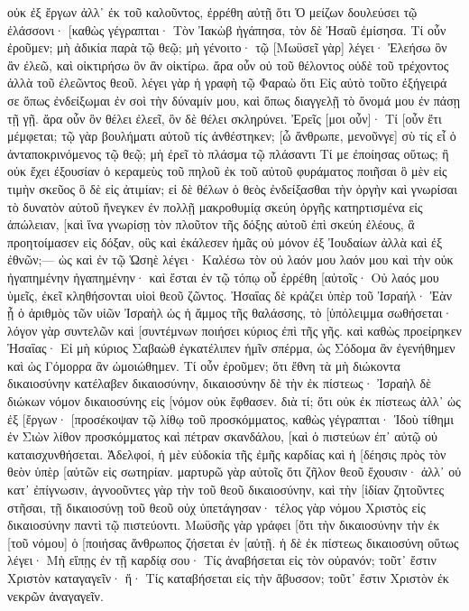 οὐκ ἐξ ἔργων ἀλλ᾽ ἐκ τοῦ καλοῦντος, ἐρρέθη αὐτῇ ὅτι Ὁ μείζων δουλεύσει τῷ ἐλάσσονι· 
[καθὼς γέγραπται· Τὸν Ἰακὼβ ἠγάπησα, τὸν δὲ Ἠσαῦ ἐμίσησα. 
Τί οὖν ἐροῦμεν; μὴ ἀδικία παρὰ τῷ θεῷ; μὴ γένοιτο· 
τῷ [Μωϋσεῖ γὰρ] λέγει· Ἐλεήσω ὃν ἂν ἐλεῶ, καὶ οἰκτιρήσω ὃν ἂν οἰκτίρω. 
ἄρα οὖν οὐ τοῦ θέλοντος οὐδὲ τοῦ τρέχοντος ἀλλὰ τοῦ ἐλεῶντος θεοῦ. 
λέγει γὰρ ἡ γραφὴ τῷ Φαραὼ ὅτι Εἰς αὐτὸ τοῦτο ἐξήγειρά σε ὅπως ἐνδείξωμαι ἐν σοὶ τὴν δύναμίν μου, καὶ ὅπως διαγγελῇ τὸ ὄνομά μου ἐν πάσῃ τῇ γῇ. 
ἄρα οὖν ὃν θέλει ἐλεεῖ, ὃν δὲ θέλει σκληρύνει. 
Ἐρεῖς [μοι οὖν]· Τί [οὖν ἔτι μέμφεται; τῷ γὰρ βουλήματι αὐτοῦ τίς ἀνθέστηκεν; 
[ὦ ἄνθρωπε, μενοῦνγε] σὺ τίς εἶ ὁ ἀνταποκρινόμενος τῷ θεῷ; μὴ ἐρεῖ τὸ πλάσμα τῷ πλάσαντι Τί με ἐποίησας οὕτως; 
ἢ οὐκ ἔχει ἐξουσίαν ὁ κεραμεὺς τοῦ πηλοῦ ἐκ τοῦ αὐτοῦ φυράματος ποιῆσαι ὃ μὲν εἰς τιμὴν σκεῦος ὃ δὲ εἰς ἀτιμίαν; 
εἰ δὲ θέλων ὁ θεὸς ἐνδείξασθαι τὴν ὀργὴν καὶ γνωρίσαι τὸ δυνατὸν αὐτοῦ ἤνεγκεν ἐν πολλῇ μακροθυμίᾳ σκεύη ὀργῆς κατηρτισμένα εἰς ἀπώλειαν, 
[καὶ ἵνα γνωρίσῃ τὸν πλοῦτον τῆς δόξης αὐτοῦ ἐπὶ σκεύη ἐλέους, ἃ προητοίμασεν εἰς δόξαν, 
οὓς καὶ ἐκάλεσεν ἡμᾶς οὐ μόνον ἐξ Ἰουδαίων ἀλλὰ καὶ ἐξ ἐθνῶν;— 
ὡς καὶ ἐν τῷ Ὡσηὲ λέγει· Καλέσω τὸν οὐ λαόν μου λαόν μου καὶ τὴν οὐκ ἠγαπημένην ἠγαπημένην· 
καὶ ἔσται ἐν τῷ τόπῳ οὗ ἐρρέθη [αὐτοῖς· Οὐ λαός μου ὑμεῖς, ἐκεῖ κληθήσονται υἱοὶ θεοῦ ζῶντος. 
Ἠσαΐας δὲ κράζει ὑπὲρ τοῦ Ἰσραήλ· Ἐὰν ᾖ ὁ ἀριθμὸς τῶν υἱῶν Ἰσραὴλ ὡς ἡ ἄμμος τῆς θαλάσσης, τὸ [ὑπόλειμμα σωθήσεται· 
λόγον γὰρ συντελῶν καὶ [συντέμνων ποιήσει κύριος ἐπὶ τῆς γῆς. 
καὶ καθὼς προείρηκεν Ἠσαΐας· Εἰ μὴ κύριος Σαβαὼθ ἐγκατέλιπεν ἡμῖν σπέρμα, ὡς Σόδομα ἂν ἐγενήθημεν καὶ ὡς Γόμορρα ἂν ὡμοιώθημεν. 
Τί οὖν ἐροῦμεν; ὅτι ἔθνη τὰ μὴ διώκοντα δικαιοσύνην κατέλαβεν δικαιοσύνην, δικαιοσύνην δὲ τὴν ἐκ πίστεως· 
Ἰσραὴλ δὲ διώκων νόμον δικαιοσύνης εἰς [νόμον οὐκ ἔφθασεν. 
διὰ τί; ὅτι οὐκ ἐκ πίστεως ἀλλ᾽ ὡς ἐξ [ἔργων· [προσέκοψαν τῷ λίθῳ τοῦ προσκόμματος, 
καθὼς γέγραπται· Ἰδοὺ τίθημι ἐν Σιὼν λίθον προσκόμματος καὶ πέτραν σκανδάλου, [καὶ ὁ πιστεύων ἐπ᾽ αὐτῷ οὐ καταισχυνθήσεται. 
Ἀδελφοί, ἡ μὲν εὐδοκία τῆς ἐμῆς καρδίας καὶ ἡ [δέησις πρὸς τὸν θεὸν ὑπὲρ [αὐτῶν εἰς σωτηρίαν. 
μαρτυρῶ γὰρ αὐτοῖς ὅτι ζῆλον θεοῦ ἔχουσιν· ἀλλ᾽ οὐ κατ᾽ ἐπίγνωσιν, 
ἀγνοοῦντες γὰρ τὴν τοῦ θεοῦ δικαιοσύνην, καὶ τὴν [ἰδίαν ζητοῦντες στῆσαι, τῇ δικαιοσύνῃ τοῦ θεοῦ οὐχ ὑπετάγησαν· 
τέλος γὰρ νόμου Χριστὸς εἰς δικαιοσύνην παντὶ τῷ πιστεύοντι. 
Μωϋσῆς γὰρ γράφει [ὅτι τὴν δικαιοσύνην τὴν ἐκ [τοῦ νόμου] ὁ [ποιήσας ἄνθρωπος ζήσεται ἐν [αὐτῇ. 
ἡ δὲ ἐκ πίστεως δικαιοσύνη οὕτως λέγει· Μὴ εἴπῃς ἐν τῇ καρδίᾳ σου· Τίς ἀναβήσεται εἰς τὸν οὐρανόν; τοῦτ᾽ ἔστιν Χριστὸν καταγαγεῖν· 
ἤ· Τίς καταβήσεται εἰς τὴν ἄβυσσον; τοῦτ᾽ ἔστιν Χριστὸν ἐκ νεκρῶν ἀναγαγεῖν. 
